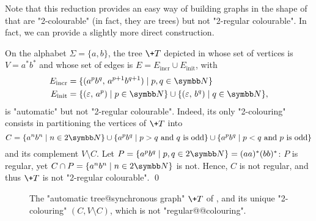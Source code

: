 Note that this reduction provides an easy way of building
graphs in the shape of  that are "2-colourable" (in fact, they are trees) but not "2-regular colourable". In fact, we can provide a slightly more
direct construction.

\begin{example}
    \AP\label{ex:tree-not-2-reg-colourable}
    On the alphabet $\Sigma = \{a,b\}$, the tree $\+T$ depicted in  whose set of vertices is $V = a^*b^*$ and whose set 
    of edges is $E = E_{\mathrm{incr}} \cup E_{\mathrm{init}}$, with 
    \begin{align*}
        E_{\mathrm{incr}} & = \{(a^pb^q,\, a^{p+1}b^{q+1}) \mid p,q \in \N\} \\
        E_{\mathrm{init}} & = \{(\varepsilon,\, a^p) \mid p \in \N\} \cup \{(\varepsilon,\, b^q) \mid q \in \N\}, 
    \end{align*}    
    is "automatic" but not "2-regular colourable". 
    Indeed, its only "2-colouring"
    consists in partitioning the vertices of $\+T$ into
    \[
        C = \{a^n b^n \mid n \in 2\N\}
            \cup \{a^p b^q \mid p > q \text{ and $q$ is odd}\}
            \cup \{a^p b^q \mid p < q \text{ and $p$ is odd}\}
    \]
    and its complement $V \setminus C$.
    Let $P = \{a^p b^q \mid p, q \in 2\N\} = (aa)^*(bb)^*$:
    $P$ is regular, yet $C \cap P = \{a^n b^n \mid n \in 2\N\}$ is not.
    Hence, $C$ is not regular, and thus $\+T$ is not "2-regular colourable".
    \qed 
\end{example}

\begin{figure}[htb]
    \centering
    \begin{tikzpicture}
        
    \end{tikzpicture}
    \caption{
        \label{fig:tree-not-2reg-colour}
        The "automatic tree@synchronous graph" $\+T$ of ,
        and its unique "2-colouring" $(C, V\setminus C)$, which is not "regular@@colouring".
    }
\end{figure}
